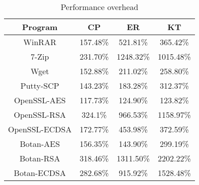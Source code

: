 \begin{table}[!htb]
\centering
\small
\begin{tabular}{c|ccc}
\textbf{Program} & \textbf{CP} & \textbf{ER} & \textbf{KT} \\

\hline
\hline
{WinRAR}		& 157.48\%		& 521.81\%		& 365.42\% \\

 
{7-Zip}			& 231.70\%		& 1248.32\%		& 1015.48\% \\

 
{Wget}			& 152.88\%		& 211.02\%		& 258.80\% \\

 
{Putty-SCP}		& 143.23\%		& 183.28\%		& 312.37\% \\

 
\hline
OpenSSL-AES		& 117.73\% 		& 124.90\%		& 123.82\% \\

 
OpenSSL-RSA		& 324.1\%  		& 966.53\%		& 1158.97\% \\

 
OpenSSL-ECDSA	& 172.77\% 		& 453.98\%		& 372.59\% \\

 
Botan-AES		& 156.35\%  	& 143.90\%		& 299.19\% \\

 
Botan-RSA		& 318.46\% 		& 1311.50\%		& 2202.22\% \\

 
Botan-ECDSA		& 282.68\%  	& 915.92\%		& 1528.48\% \\

\hline

\end{tabular}
\caption{Performance overhead \label{tab:perf}}
\end{table}
